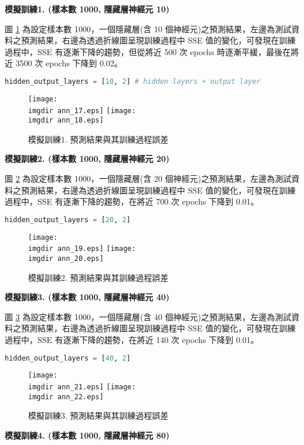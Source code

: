 \textbf{\large 模擬訓練1. (樣本數 1000, 隱藏層神經元 10)}

圖 \ref{fig:ann_8} 為設定樣本數 1000，一個隱藏層(含 10 個神經元)之預測結果，左邊為測試資料之預測結果，右邊為透過折線圖呈現訓練過程中 SSE 值的變化，可發現在訓練過程中，SSE 有逐漸下降的趨勢，但從將近 500 次 epochs 時逐漸平緩，最後在將近 3500 次 epochs 下降到 0.02。
\bigskip
\begin{lstlisting}[language = Python]
hidden_output_layers = [10, 2] # hidden layers + output layer
\end{lstlisting}
\begin{figure}[H]
	\centering
	\texttt{[image: \\imgdir ann\_17.eps]}
	\texttt{[image: \\imgdir ann\_18.eps]}
	\caption{模擬訓練1. 預測結果與其訓練過程誤差}
	 \label{fig:ann_8}
\end{figure}

\textbf{\large 模擬訓練2. (樣本數 1000, 隱藏層神經元 20)}

圖 \ref{fig:ann_9} 為設定樣本數 1000，一個隱藏層(含 20 個神經元)之預測結果，左邊為測試資料之預測結果，右邊為透過折線圖呈現訓練過程中 SSE 值的變化，可發現在訓練過程中，SSE 有逐漸下降的趨勢，在將近 700 次 epochs 下降到 0.01。
\bigskip
\begin{lstlisting}[language = Python]
hidden_output_layers = [20, 2] 
\end{lstlisting}
\begin{figure}[H]
	\centering
	\texttt{[image: \\imgdir ann\_19.eps]}
	\texttt{[image: \\imgdir ann\_20.eps]}
	\caption{模擬訓練2. 預測結果與其訓練過程誤差}
	 \label{fig:ann_9}
\end{figure}

\textbf{\large 模擬訓練3. (樣本數 1000, 隱藏層神經元 40)}

圖 \ref{fig:ann_10} 為設定樣本數 1000，一個隱藏層(含 40 個神經元)之預測結果，左邊為測試資料之預測結果，右邊為透過折線圖呈現訓練過程中 SSE 值的變化，可發現在訓練過程中，SSE 有逐漸下降的趨勢，在將近 140 次 epochs 下降到 0.01。
\bigskip
\begin{lstlisting}[language = Python]
hidden_output_layers = [40, 2] 
\end{lstlisting}
\begin{figure}[H]
	\centering
	\texttt{[image: \\imgdir ann\_21.eps]}
	\texttt{[image: \\imgdir ann\_22.eps]}
	\caption{模擬訓練3. 預測結果與其訓練過程誤差}
	 \label{fig:ann_10}
\end{figure}

\textbf{\large 模擬訓練4. (樣本數 1000, 隱藏層神經元 80)}

